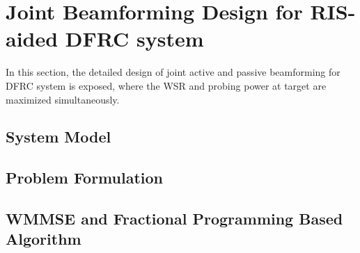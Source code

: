 \chapter{Joint Beamforming Design for RIS-aided DFRC system}\label{cha:joint-design}
In this section, the detailed design of joint active and passive beamforming for DFRC system is exposed, where the 
WSR and probing power at target are maximized simultaneously.


\section{System Model}\label{sec:system-model}
  

\section{Problem Formulation}\label{sec:problem-formulation}
  

\section{WMMSE and Fractional Programming Based Algorithm}\label{sec:algorithms}
  